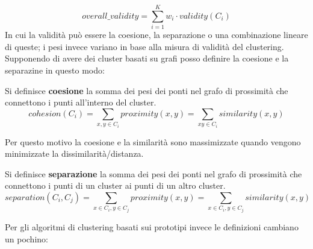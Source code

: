 \[ overall\_validity = \sum_{i = 1}^{K}w_{i} \cdot validity(C_{i})\]
In cui la validità può essere la coesione, la separazione o una combinazione lineare di queste; i pesi invece variano in base alla misura di validità del clustering.
Supponendo di avere dei cluster basati su grafi posso definire la coesione e la separazine in questo modo:

\begin{defn}
	Si definisce \textbf{coesione} la somma dei pesi dei ponti nel grafo di prossimità che connettono i punti all'interno del  cluster.
	\[ cohesion(C_i) = \sum_{x, y \in C_i} proximity(x,y) = \sum_{x y \in C_i} similarity(x,y)\]
\end{defn}
Per questo motivo la coesione e la similarità sono massimizzate quando vengono minimizzate la dissimilarità/distanza.

\begin{defn}
	Si definisce \textbf{separazione} la somma dei pesi dei ponti nel grafo di prossimità che connettono i punti di un cluster ai punti di un altro cluster.
	\[separation(C_{i}, C_{j}) = \sum_{x \in C_{i},y\in C_{j} }proximity(x,y) = \sum_{x \in C_{i},y\in C_{j} }similarity(x,y)   \]
\end{defn}

Per gli algoritmi di clustering basati sui prototipi invece le definizioni cambiano un pochino:

